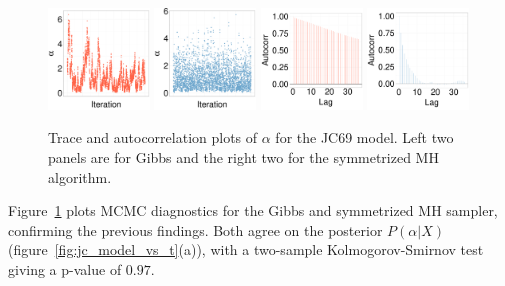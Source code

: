   \begin{figure}[H]
  \centering

  \begin{minipage}[!hp]{0.99\linewidth}
  	\centering
    \includegraphics [width=0.24\textwidth, angle=0]{figs/JC_ks/jc_traceGBS_44_05_3_.pdf}
    \includegraphics [width=0.24\textwidth, angle=0]{figs/JC_ks/jc_traceMH_44_05_3_.pdf}
    \includegraphics [width=0.24\textwidth, angle=0]{figs/JC_ks/jc_gbsacf_44_05_3_.pdf}
    \includegraphics [width=0.24\textwidth, angle=0]{figs/JC_ks/jc_mhacf_44_05_3_.pdf}
  \end{minipage}
    \caption{Trace and autocorrelation plots of $\alpha$ for the JC69 model. Left two panels are for Gibbs and the right two for the symmetrized MH algorithm.}
    \label{fig:ACC_JC_m}
    \vspace{-.15in}
  \end{figure}
  Figure~\ref{fig:ACC_JC_m} plots MCMC diagnostics for the Gibbs and symmetrized MH sampler, confirming the previous findings. 
  Both agree on the posterior $P(\alpha|X)$ (figure~\ref{fig:jc_model_vs_t}(a)), with a two-sample Kolmogorov-Smirnov test giving a p-value of $0.97$. 
